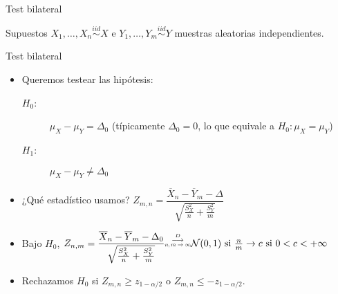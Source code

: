 \documentclass{beamer}
\theoremstyle{definition}
\newcommand\scalemath[2]{\scalebox{#1}{\mbox{\ensuremath{\displaystyle #2}}}}
\begin{document}
\begin{frame}{\color{rosee} Test bilateral} \small

 \begin{block}{Supuestos}
  {\small $X_1,\dots,X_{n}\stackrel{iid}{\sim}X$ e $Y_1,\dots,Y_{m}\stackrel{iid}{\sim}Y$} muestras aleatorias independientes.
 \end{block}
 \begin{block}{Test bilateral}
   \begin{itemize}
   \item Queremos testear las hip\'otesis:
     \begin{description}
     \item[$H_0$:] $\mu_X - \mu_Y = \Delta_0$ (típicamente $\Delta_0=0$, lo que equivale a $H_0:\mu_X = \mu_Y$)
     \item[$H_1$:] $\mu_X -\mu_Y \neq \Delta_0$
     \end{description}
   \item ¿Qu\'e estad\'istico usamos? $Z_{m,n} =
       \dfrac{\overline{X}_{n}-\overline{Y}_{m}-\Delta}{\sqrt{\frac{S_X^{2}}{n}
           + \frac{S_Y^2}{m}}}$
   \item  Bajo $H_0$, $Z_{n,m}= \dfrac{\overline{X}_{n}-\overline{Y}_{m}-\Delta_0}{\sqrt{\frac{S_X^{2}}{n}
           + \frac{S_Y^2}{m}}} \overset{\stackrel{D}{\longrightarrow}}{\scalemath{0.6}{n,m\to\infty}} \mathcal{N}(0,1) \text{ si } \frac{n}{m}\to c \text{ si } 0<c<+\infty$
   \item Rechazamos $H_0$ si $Z_{m,n} \geq z_{1-\alpha/2}$ o $Z_{m,n} \leq -z_{1-\alpha/2}$.
   \end{itemize}
 \end{block}

\end{frame}
\end{document}
